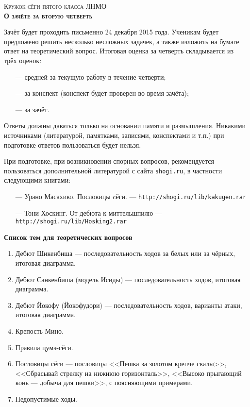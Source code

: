 \documentclass[12pt]{article}
\begin{document}
\begin{center}{{\scshape\large Кружок сёги пятого класса ЛНМО}\bfseries\\\medbreak \scshape\Large О зачёте за вторую четверть}\end{center}

\vspace{1cm}
\noindent Зачёт будет проходить письменно 24 декабря 2015 года. Ученикам будет предложено 
решить несколько несложных задачек, а также изложить на бумаге ответ на теоретический вопрос.
\bigbreak
\noindent Итоговая оценка за четверть складывается из трёх оценок:
\begin{itemize}
\setlength{\parskip}{-1ex}\relax
\item[---] средней за текущую работу в течение четверти;
\item[---] за конспект (конспект будет проверен во время зачёта);
\item[---] за зачёт.
\end{itemize}

\bigbreak
\noindent Ответы должны даваться только на основании памяти и размышления.
Никакими источниками (литературой, памятками, записями, конспектами и т.п.) при подготовке
ответов пользоваться будет нельзя.

\bigbreak
\noindent При подготовке, при возникновении спорных вопросов, рекомендуется пользоваться дополнительной 
литературой с сайта \texttt{shogi.ru}, в частности следующими книгами:
\begin{itemize}
\setlength{\parskip}{-1ex}\relax
\item[---] Урано Масахико. Пословицы cёги. --- \texttt{http://shogi.ru/lib/kakugen.rar}
\item[---] Тони Хоскинг. От дебюта к миттельшпилю --- \texttt{http://shogi.ru/lib/Hosking2.rar}
\end{itemize}

\bigbreak
\begin{center}\bfseries\large Список тем для теоретических вопросов\end{center}

\begin{enumerate}
\setlength{\parskip}{-0.3ex}\relax
\item Дебют Шикенбиша --- последовательность ходов за белых или за чёрных, итоговая диаграмма.
\item Дебют Санкенбиша (модель Исиды) --- последовательность ходов, итоговая диаграмма.
\item Дебют Йокофу (Йокофудори) --- последовательность ходов, варианты атаки, итоговая диаграмма.
\item Крепость Мино.
\item Правила цумэ-сёги.
\item Пословицы сёги --- пословицы <<Пешка за золотом крепче скалы>>, <<Сбрасывай стрелку на нижнюю горизонталь>>,
<<Высоко прыгающий конь --- добыча для пешки>>, с поясняющими примерами.
\item Недопустимые ходы.
\end{enumerate}
\end{document}
